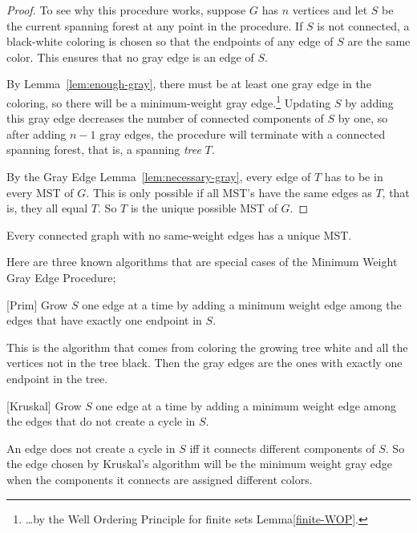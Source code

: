 \begin{proof}
To see why this procedure works, suppose $G$ has $n$ vertices and let
$S$ be the current spanning forest at any point in the procedure.  If
$S$ is not connected, a black-white coloring is chosen so that the
endpoints of any edge of $S$ are the same color.  This ensures that no
gray edge is an edge of $S$.

By Lemma~\ref{lem:enough-gray}, there must be at least one gray edge
in the coloring, so there will be a minimum-weight gray
edge.\footnote{\dots by the Well Ordering Principle for finite sets
  Lemma\ref{finite-WOP}.}  Updating $S$ by adding this gray edge
decreases the number of connected components of $S$ by one, so after
adding $n-1$ gray edges, the procedure will terminate with a connected
spanning forest, that is, a spanning \emph{tree} $T$.

By the Gray Edge Lemma~\ref{lem:necessary-gray}, every edge of $T$ has
to be in every MST of $G$.  This is only possible if all MST's have
the same edges as $T$, that is, they all equal $T$.  So $T$ is the
unique possible MST of $G$.
\end{proof}

\begin{corollary}\label{cor:uniqMST}
Every connected graph with no same-weight edges has a unique MST.
\end{corollary}

Here are three known algorithms that are special cases of the Minimum
Weight Gray Edge Procedure;

\begin{algorithm}\label{alg:MST1}[Prim]
  Grow $S$ one edge at a time by adding a minimum weight edge
  among the edges that have exactly one endpoint in $S$.
\end{algorithm}

This is the algorithm that comes from coloring the growing tree white
and all the vertices not in the tree black.  Then the gray edges are
the ones with exactly one endpoint in the tree.

\begin{algorithm}\label{alg:MST2}[Kruskal]
  Grow $S$ one edge at a time by adding a minimum weight edge among
  the edges that do not create a cycle in $S$.
\end{algorithm}

An edge does not create a cycle in $S$ iff it connects different
components of $S$.  So the edge chosen by Kruskal's algorithm will be
the minimum weight gray edge when the components it connects are
assigned different colors.

